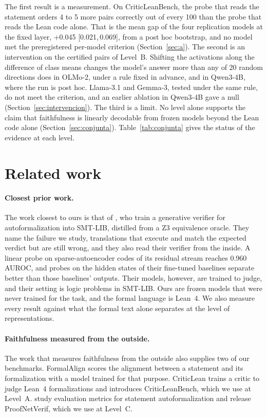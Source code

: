 \documentclass[10pt]{article}
\newcommand{\ic}[2]{[#1,\,#2]}
\begin{document}
The first result is a measurement. On CriticLeanBench, the probe that reads the statement orders 4 to 5 more pairs
correctly out of every 100 than the probe that reads the Lean code alone. That is the mean gap of the four replication
models at the fixed layer, +0.045 \ic{0.021}{0.069}, from a post hoc bootstrap, and no model met the preregistered
per-model criterion (Section~\ref{sec:a}). The second is an intervention on the certified pairs of Level~B. Shifting
the activations along the difference of class means changes the model's answer more than any of 20 random directions
does in OLMo-2, under a rule fixed in advance, and in Qwen3-4B, where the run is post hoc. Llama-3.1 and Gemma-3,
tested under the same rule, do not meet the criterion, and an earlier ablation in Qwen3-4B gave a null
(Section~\ref{sec:intervencion}). The third is a limit. No level alone supports the claim that faithfulness is
linearly decodable from frozen models beyond the Lean code alone (Section~\ref{sec:conjunta}).
Table~\ref{tab:conjunta} gives the status of the evidence at each level.

\section{Related work}

\paragraph{Closest prior work.}
The work closest to ours is that of \citet{genv}, who train a generative verifier for autoformalization into
SMT-LIB, distilled from a Z3 equivalence oracle. They name the failure we study, translations that execute and
match the expected verdict but are still wrong, and they also read their verifier from the inside. A linear probe
on sparse-autoencoder codes of its residual stream reaches 0.960 AUROC, and probes on the hidden states of their
fine-tuned baselines separate better than those baselines' outputs. Their models, however, are trained to judge,
and their setting is logic problems in SMT-LIB. Ours are frozen models that were never trained for the task, and
the formal language is Lean~4. We also measure every result against what the formal text alone separates at the
level of representations.

\paragraph{Faithfulness measured from the outside.}
The work that measures faithfulness from the outside also supplies two of our benchmarks.
FormalAlign \citep{formalalign} scores the alignment between a statement and its formalization with a model trained
for that purpose. CriticLean \citep{criticlean} trains a critic to judge Lean~4 formalizations and introduces
CriticLeanBench, which we use at Level~A. \citet{proofnetverif} study evaluation metrics for statement
autoformalization and release ProofNetVerif, which we use at Level~C.
\end{document}
